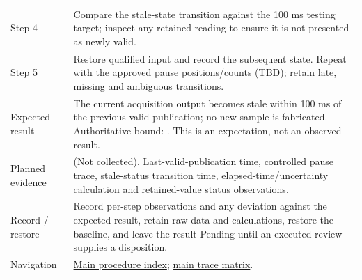 \begin{tabularx}{\linewidth}{L{3.2cm}Y}
Step 4 & Compare the stale-state transition against the 100 ms testing target; inspect any retained reading to ensure it is not presented as newly valid.\\
Step 5 & Restore qualified input and record the subsequent state. Repeat with the approved pause positions/counts (TBD); retain late, missing and ambiguous transitions.\\
Expected result & The current acquisition output becomes stale within 100 ms of the previous valid publication; no new sample is fabricated. Authoritative bound: . This is an expectation, not an observed result.\\
Planned evidence &  (Not collected). Last-valid-publication time, controlled pause trace, stale-status transition time, elapsed-time/uncertainty calculation and retained-value status observations.\\
Record / restore & Record per-step observations and any deviation against the expected result, retain raw data and calculations, restore the baseline, and leave the result Pending until an executed review supplies a disposition.\\
Navigation & \hyperref[Table:WeekTwoTests]{Main procedure index}; \hyperref[Table:TraceabilityMatrix]{main trace matrix}.\\
\end{tabularx}
\normalsize
